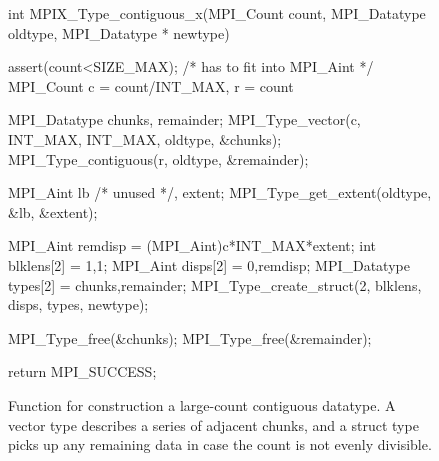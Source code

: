\begin{figure}
\begin{code}
int MPIX_Type_contiguous_x(MPI_Count count, 
                           MPI_Datatype oldtype, 
                           MPI_Datatype * newtype)
{
    assert(count<SIZE_MAX); /* has to fit into MPI_Aint */
    MPI_Count c = count/INT_MAX, r = count%

    MPI_Datatype chunks, remainder;
    MPI_Type_vector(c, INT_MAX, INT_MAX, oldtype, &chunks);
    MPI_Type_contiguous(r, oldtype, &remainder);

    MPI_Aint lb /* unused */, extent;
    MPI_Type_get_extent(oldtype, &lb, &extent);

    MPI_Aint remdisp          = (MPI_Aint)c*INT_MAX*extent;
    int blklens[2]            = {1,1};
    MPI_Aint disps[2]         = {0,remdisp};
    MPI_Datatype types[2]     = {chunks,remainder};
    MPI_Type_create_struct(2,
    	blklens, disps, types, newtype);

    MPI_Type_free(&chunks);
    MPI_Type_free(&remainder);

    return MPI_SUCCESS;
}
\end{code}
\caption{Function for construction a large-count contiguous datatype.
A vector type describes a series of adjacent chunks, and a struct type picks up
any remaining data in case the count is not evenly divisible.}
\label{code:type_contig_x}
\end{figure}










